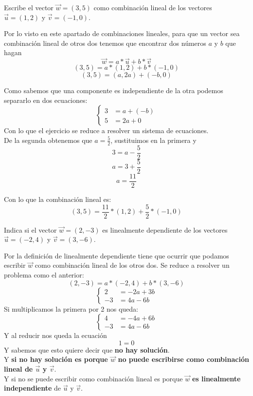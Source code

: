 \documentclass[a4paper,11pt,answers]{exam}
\begin{document}
\begin{questions}
\question Escribe el vector $\vec{w} = (3, 5)$ como combinación lineal de los vectores
  $\vec{u} = (1,2)$ y $\vec{v} = (-1, 0)$.
  \begin{solution}
    Por lo visto en este apartado de combinaciones lineales, para que un vector sea combinación
    lineal de otros dos tenemos que encontrar dos números $a$ y $b$ que hagan
    \[\vec{w} = a*\vec{u} + b*\vec{v}\]
    \[(3,5) = a*(1, 2) + b*(-1, 0)\]
    \[(3,5) = (a, 2a) + (-b, 0)\]

    Como sabemos que una componente es independiente de la otra podemos separarlo en dos ecuaciones:
    \[
      \begin{cases}
        3 & = a+(-b)\\
        5 &= 2a + 0
      \end{cases}
    \]
    Con lo que el ejercicio se reduce a resolver un sistema de ecuaciones.\\

    De la segunda obtenemos que $a =\frac{5}{2}$, sustituimos en la primera y
    \[3 = a - \frac{5}{2}\]
    \[a = 3 + \frac{5}{2}\]
    \[a = \frac{11}{2}\]

    Con lo que la combinación lineal es:
    \[(3, 5) = \frac{11}{2}*(1, 2) + \frac{5}{2}*(-1, 0)\]
  \end{solution}
\question Indica si el vector $\vec{w} = (2, -3)$ es linealmente dependiente de los vectores
  $\vec{u} = (-2, 4)$ y $\vec{v}= (3, -6)$.
  \begin{solution}
    Por la definición de linealmente dependiente tiene que ocurrir que podamos escribir $\vec{w}$
    como combinación lineal de los otros dos. Se reduce a resolver un problema como el anterior:
    \[(2, -3) = a*(-2, 4) + b*(3, -6)\]
    \[
      \begin{cases}
        2 & = -2a + 3b\\
        -3 &= 4a -6b
      \end{cases}
    \]
    Si multiplicamos la primera por 2 nos queda:
    \[
      \begin{cases}
        4 & = -4a + 6b\\
        -3 &= 4a -6b
      \end{cases}
    \]
    Y al reducir nos queda la ecuación
    \[1 = 0\]
    Y sabemos que esto quiere decir que \textbf{no hay solución}.\\
    Y \textbf{si no hay solución es porque $\vec{w}$ no puede escribirse como combinación lineal de
      $\vec{u}$ y $\vec{v}$}.\\
    Y si no se puede escribir como combinación lineal es porque $\vec{w}$
    \textbf{es linealmente independiente} de $\vec{u}$ y $\vec{v}$.
  \end{solution}
\end{questions}
\end{document}

